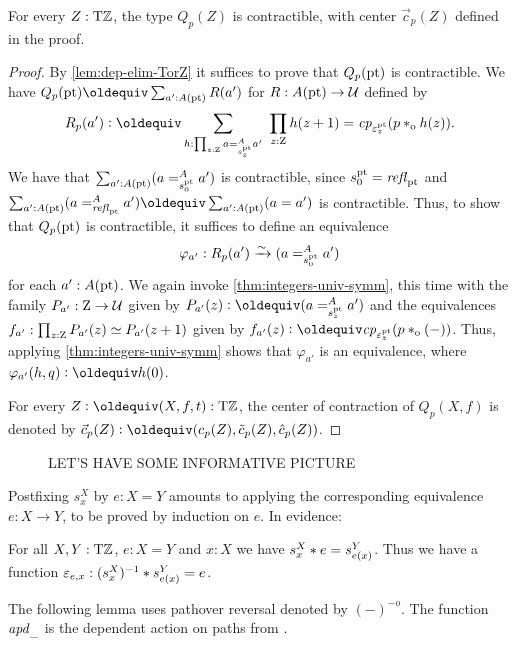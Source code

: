 \documentclass[a4,12pt]{amsart}
\begin{document}
\begin{lemma}\label{lem:guided-null-hmtps-dep}
  For every $Z:{\mathrm{T}\mathbb{Z}}$, the type $Q_p(Z)$ is contractible, 
  with center $\vec{c}_p(Z)$ defined in the proof.
\end{lemma}
\begin{proof}
  By \cref{lem:dep-elim-TorZ} it suffices to prove that $Q_p({\mathord{\mathrm{pt}}})$ is contractible.
  We have $Q_p(\pt)\jdeq \sum_{a':A(\pt)} R(a')$ for $R : A({\mathord{\mathrm{pt}}}) \to \mathcal{U}$ defined by
  \[
    R_p(a') \defeq \sum_{h : \prod_{z:\zet} a =^A_{s^\pt_z} a'}~
    \prod_{z:\zet} h(z+1) = \cp{\varepsilon^\pt_z}(p \cto h(z)).
  \]
  We have that $\sum_{a':A({\mathord{\mathrm{pt}}})} (a =^A_{s^{\mathord{\mathrm{pt}}}_0} {a'})$ is contractible,
  since $s^{\mathord{\mathrm{pt}}}_0 = \mathop{{\it refl}_{{\mathord{\mathrm{pt}}}}}$ and 
  $\sum_{a':A(\pt)} (a =^A_{\refl{\pt}} a') \jdeq \sum_{a':A(\pt)} (a = a')$
  is contractible.
  Thus, to show that $Q_p({\mathord{\mathrm{pt}}})$ is contractible,
  it suffices to define an equivalence
  \[
    \varphi_{a'} : R_p(a') \xrightarrow{\sim}{} (a =^A_{s^{\mathord{\mathrm{pt}}}_0} {a'})
  \]
  for each $a' : A({\mathord{\mathrm{pt}}})$.
  We again invoke \cref{thm:integers-univ-symm},
  this time with the family $P_{a'} : \mathrm{Z} \to \mathcal{U}$ given 
  by $P_{a'}(z) \defeq (a =^A_{s^\pt_z} {a'})$
  and the equivalences $f_{a'} : \prod_{z:\mathrm{Z}} P_{a'}(z)\simeq P_{a'}(z+1)$ 
  given by $f_{a'}(z) \defeq \cp{\varepsilon^\pt_z}(p \cto ({-}))$.
  Thus, applying \cref{thm:integers-univ-symm}
  shows that $\varphi_{a'}$ is an equivalence,
  where $\varphi_{a'}(h,q) \defeq h(0)$.

For every $Z\defeq(X,f,t):\TorZ$, the center of contraction of $Q_p(X,f)$ 
is denoted by $\vec{c}_p(Z)\defeq(c_p(Z),\tilde{c}_p(Z),\hat{c}_p(Z))$.
\end{proof}


\begin{figure}
\caption{\label{fig:TorZ-induction}LET'S HAVE SOME INFORMATIVE PICTURE}
\end{figure}

Postfixing $s^X_x$ by $e: X=Y$ amounts to
applying the corresponding equivalence $e: X\to Y$, to be proved
by induction on $e$. In evidence:

\begin{lemma}\label{lem:s-X-x-*-e}
  For all $X,Y:{\mathrm{T}\mathbb{Z}}$, $e: X=Y$ and $x:X$ we have $s^X_x * e = s^Y_{e(x)}$.
  Thus we have a function $\varepsilon_{e,x} : (s^X_x)^{-1} * s^Y_{e(x)} = e$.
\end{lemma}

The following lemma uses pathover reversal denoted by $({-})^{-o}$.
The function $\mathop{{\it apd}_{\_}}$ is the dependent action on paths from \cite[Ch. XX]{hottbook}.
\end{document}
